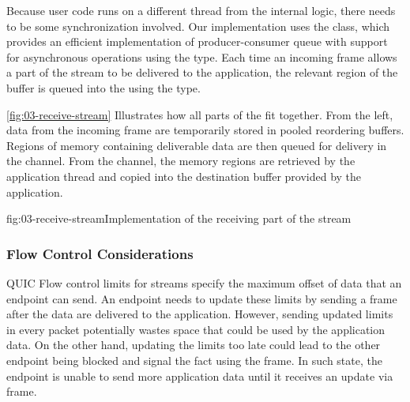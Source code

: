 Because user code runs on a different thread from the internal \QuicConnection{} logic, there needs
to be some synchronization involved. Our implementation uses the  class, which
provides an efficient implementation of producer-consumer queue with support for asynchronous
operations using the  type. Each time an incoming \STREAM{} frame allows a part
of the stream to be delivered to the application, the relevant region of the buffer is queued into
the  using the  type.





\autoref{fig:03-receive-stream} Illustrates how all parts of the \ReceiveStream{} fit together.
From the left, data from the incoming \STREAM{} frame are temporarily stored in pooled reordering
buffers. Regions of memory containing deliverable data are then queued for delivery in the channel.
From the channel, the memory regions are retrieved by the application thread and copied into the
destination buffer provided by the application.

\begin{myFigure}{fig:03-receive-stream}{Implementation of the receiving part of the stream}

  \resizebox{\linewidth}{!}{}

\end{myFigure}

\subsubsection{Flow Control Considerations}

QUIC Flow control limits for streams specify the maximum offset of data that an endpoint can send.
An endpoint needs to update these limits by sending a \MAXSTREAMDATA{} frame after the data are
delivered to the application. However, sending updated limits in every packet potentially wastes
space that could be used by the application data. On the other hand, updating the limits too late
could lead to the other endpoint being blocked and signal the fact using the \STREAMDATABLOCKED{}
frame. In such state, the endpoint is unable to send more application data until it receives an
update via \MAXSTREAMDATA{} frame.

